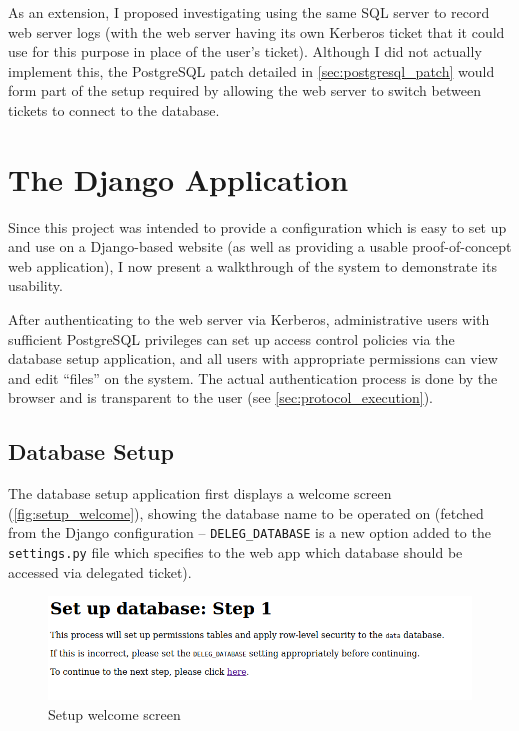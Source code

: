 \documentclass[12pt]{report}
\begin{document}
As an extension, I proposed investigating using the same SQL server to record web server logs (with the web server having its own Kerberos ticket that it could use for this purpose in place of the user's ticket). Although I did not actually implement this, the PostgreSQL patch detailed in \autoref{sec:postgresql_patch} would form part of the setup required by allowing the web server to switch between tickets to connect to the database.

\section{The Django Application}
Since this project was intended to provide a configuration which is easy to set up and use on a Django-based website (as well as providing a usable proof-of-concept web application), I now present a walkthrough of the system to demonstrate its usability.

After authenticating to the web server via Kerberos, administrative users with sufficient PostgreSQL privileges can set up access control policies via the database setup application, and all users with appropriate permissions can view and edit ``files'' on the system. The actual authentication process is done by the browser and is transparent to the user (see \autoref{sec:protocol_execution}).

\subsection{Database Setup}
The database setup application first displays a welcome screen (\autoref{fig:setup_welcome}), showing the database name to be operated on (fetched from the Django configuration -- \verb+DELEG_DATABASE+ is a new option added to the \verb+settings.py+ file which specifies to the web app which database should be accessed via delegated ticket).

\begin{figure}[h]
  \begin{center}
    \includegraphics[scale=0.5]{02-setup1.png}
  \end{center}
  \caption{Setup welcome screen}
  \label{fig:setup_welcome}
\end{figure}
\end{document}
